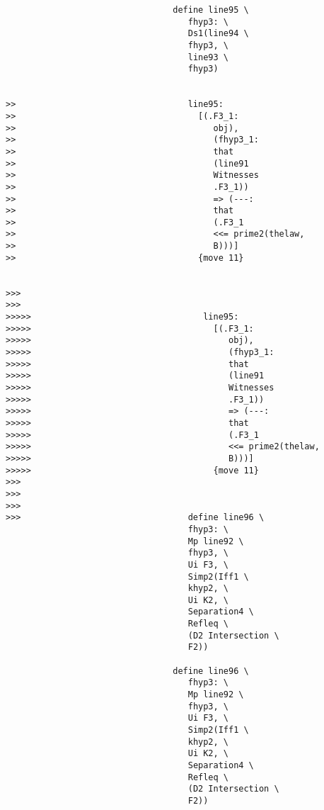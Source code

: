\documentclass[12pt]{article}
\begin{document}
\begin{verbatim}
                                 define line95 \
                                    fhyp3: \
                                    Ds1(line94 \
                                    fhyp3, \
                                    line93 \
                                    fhyp3)


>>                                  line95:
>>                                    [(.F3_1:
>>                                       obj),
>>                                       (fhyp3_1:
>>                                       that
>>                                       (line91
>>                                       Witnesses
>>                                       .F3_1))
>>                                       => (---:
>>                                       that
>>                                       (.F3_1
>>                                       <<= prime2(thelaw,
>>                                       B)))]
>>                                    {move 11}


>>>
>>>
>>>>>                                  line95:
>>>>>                                    [(.F3_1:
>>>>>                                       obj),
>>>>>                                       (fhyp3_1:
>>>>>                                       that
>>>>>                                       (line91
>>>>>                                       Witnesses
>>>>>                                       .F3_1))
>>>>>                                       => (---:
>>>>>                                       that
>>>>>                                       (.F3_1
>>>>>                                       <<= prime2(thelaw,
>>>>>                                       B)))]
>>>>>                                    {move 11}
>>>
>>>
>>>
>>>                                 define line96 \
                                    fhyp3: \
                                    Mp line92 \
                                    fhyp3, \
                                    Ui F3, \
                                    Simp2(Iff1 \
                                    khyp2, \
                                    Ui K2, \
                                    Separation4 \
                                    Refleq \
                                    (D2 Intersection \
                                    F2))

                                 define line96 \
                                    fhyp3: \
                                    Mp line92 \
                                    fhyp3, \
                                    Ui F3, \
                                    Simp2(Iff1 \
                                    khyp2, \
                                    Ui K2, \
                                    Separation4 \
                                    Refleq \
                                    (D2 Intersection \
                                    F2))


\end{verbatim}
\end{document}
